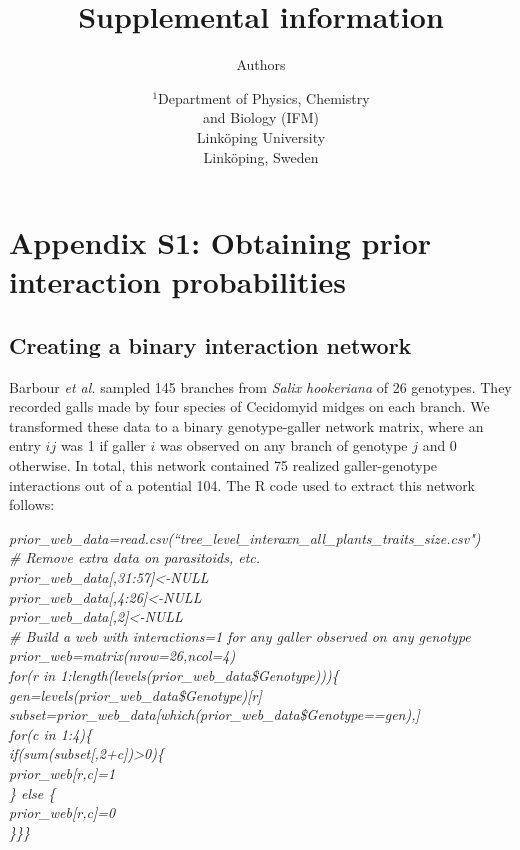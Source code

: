 \documentclass[12pt]{article}
\title{Supplemental information}
\author{Authors}
\date{\small$^1$Department of Physics, Chemistry\\ 
and Biology (IFM)\\ 
Link\"{o}ping University\\
Link\"{o}ping, Sweden\\
 }
\begin{document}
 
\maketitle 
\raggedright
\setlength{\parindent}{15pt} 
\clearpage

\section*{Appendix S1: Obtaining prior interaction probabilities}

    \subsection*{Creating a binary interaction network}

      Barbour \emph{et al.} sampled 145 branches from 
      \emph{Salix hookeriana} of 26 genotypes. They recorded galls 
      made by four species of Cecidomyid midges on each branch. We 
      transformed these data to a binary genotype-galler network 
      matrix, where an entry $ij$ was 1 if galler $i$ was observed 
      on any branch of genotype $j$ and 0 otherwise. In total, this 
      network contained 75 realized galler-genotype interactions 
      out of a potential 104. The R code used to extract this 
      network follows:


      \vspace{12pt}
      \emph{
      \noindent \hspace{-4pt} prior\_web\_data=read.csv(``tree\_level\_interaxn\_all\_plants\_traits\_size.csv")\\
      \# Remove extra data on parasitoids, etc.\\
      prior\_web\_data[,31:57]\textless-NULL\\
      prior\_web\_data[,4:26]\textless-NULL\\
      prior\_web\_data[,2]\textless-NULL\\
      \# Build a web with interactions=1 for any galler observed on any genotype\\
      prior\_web=matrix(nrow=26,ncol=4)\\
      for(r in 1:length(levels(prior\_web\_data\$Genotype)))\{\\
      \hspace{4pt}  gen=levels(prior\_web\_data\$Genotype)[r]\\
      \hspace{4pt}  subset=prior\_web\_data[which(prior\_web\_data\$Genotype==gen),]\\
      \hspace{4pt}  for(c in 1:4)\{\\
      \hspace{8pt}    if(sum(subset[,2+c])\textgreater0)\{\\
      \hspace{12pt}      prior\_web[r,c]=1\\
      \hspace{8pt}    \} else \{\\
      \hspace{12pt}      prior\_web[r,c]=0\\
      \hspace{8pt}    \}\}\}
      }
\end{document}
